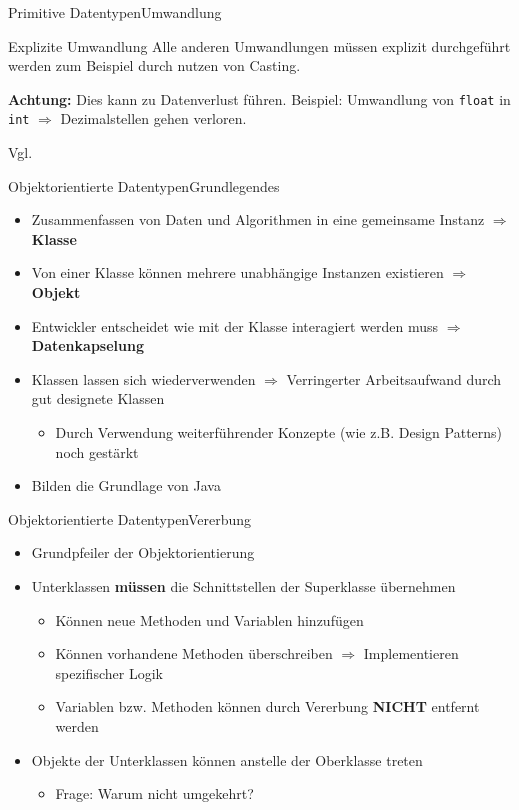 \begin{frame}{Primitive Datentypen}{Umwandlung}
    \begin{alertblock}{Explizite Umwandlung}
        Alle anderen Umwandlungen müssen explizit durchgeführt werden zum Beispiel durch nutzen von Casting.
        
        \textbf{Achtung:} Dies kann zu Datenverlust führen. Beispiel: Umwandlung von \texttt{float} in \texttt{int} $\Rightarrow$ Dezimalstellen gehen verloren.
    \end{alertblock}
    Vgl. \cite{wiki:primdt}
\end{frame}

\begin{frame}{Objektorientierte Datentypen}{Grundlegendes}
    \begin{itemize}
        \item Zusammenfassen von Daten und Algorithmen in eine gemeinsame Instanz $\Rightarrow$ \textbf{Klasse}
        \item Von einer Klasse können mehrere unabhängige Instanzen existieren $\Rightarrow$ \textbf{Objekt}
        \item Entwickler entscheidet wie mit der Klasse interagiert werden muss $\Rightarrow$ \textbf{Datenkapselung}
        \item Klassen lassen sich wiederverwenden $\Rightarrow$ Verringerter Arbeitsaufwand durch gut designete Klassen
        \begin{itemize}
            \item Durch Verwendung weiterführender Konzepte (wie z.B. Design Patterns) noch gestärkt
        \end{itemize}
        \item Bilden die Grundlage von Java
    \end{itemize}
\end{frame}

\begin{frame}{Objektorientierte Datentypen}{Vererbung}
    \begin{itemize}
        \item Grundpfeiler der Objektorientierung
        \item Unterklassen \textbf{müssen} die Schnittstellen der Superklasse übernehmen
        \begin{itemize}
            \item Können neue Methoden und Variablen hinzufügen
            \item Können vorhandene Methoden überschreiben $\Rightarrow$ Implementieren spezifischer Logik
            \item Variablen bzw. Methoden können durch Vererbung \textbf{NICHT} entfernt werden
        \end{itemize}
        \item Objekte der Unterklassen können anstelle der Oberklasse treten
        \begin{itemize}
            \item Frage: Warum nicht umgekehrt?
        \end{itemize}
    \end{itemize}
\end{frame}

